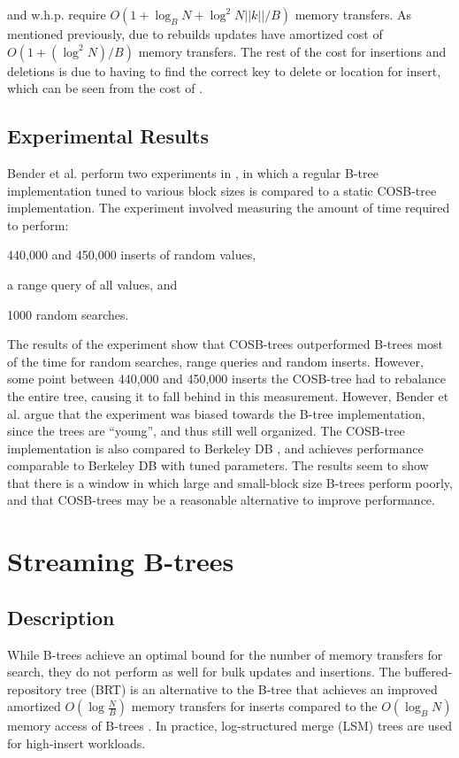\documentclass[preprint]{style}
\begin{document}
\Insertkonly{} and \Delete{} w.h.p. require $O(1+\log_{B}N+\log^{2}N||k||/B)$
memory transfers. As mentioned previously, due to rebuilds updates have
amortized cost of $O(1+(\log^{2}N)/B)$ memory transfers. The rest of the cost
for insertions and deletions is due to having to find the correct key to
delete or location for insert, which can be seen from the cost of \Search{}.

\subsection{Experimental Results}
Bender et al. perform two experiments in \cite{BenderFaKu06}, in which a
regular B-tree implementation tuned to various block sizes is compared to a
static COSB-tree implementation. The experiment involved measuring the amount
of time required to perform:
\begin{inparaenum}[(a)]
  \item 440,000 and 450,000 inserts of random values, 
  \item a range query of all values, and 
  \item 1000 random searches.
\end{inparaenum} The results of the
experiment show that COSB-trees outperformed B-trees most of the time for
random searches, range queries and random inserts. However, some point between
440,000 and 450,000 inserts the COSB-tree had to rebalance the entire tree,
causing it to fall behind in this measurement. However, Bender et al. argue
that the experiment was biased towards the B-tree implementation, since the
trees are ``young'', and thus still well organized. The COSB-tree
implementation is also compared to Berkeley DB \cite{BerkeleyDB}, and achieves
performance comparable to Berkeley DB with tuned parameters. The results seem
to show that there is a window in which large and small-block size B-trees
perform poorly, and that COSB-trees may be a reasonable alternative to improve
performance. 

\section{Streaming B-trees}

\subsection{Description}

While B-trees achieve an optimal bound for the number of memory transfers for
search, they do not perform as well for bulk updates and insertions. The
buffered-repository tree (BRT) is an alternative to the B-tree that achieves an
improved amortized $O(\log{\frac{N}{B}})$ memory transfers for inserts compared
to the $O(\log_{B}{N})$ memory access of B-trees \cite{Buchsbaum}. In practice, log-structured
merge (LSM) trees \cite{ONeil96} are used for high-insert workloads.
\end{document}
